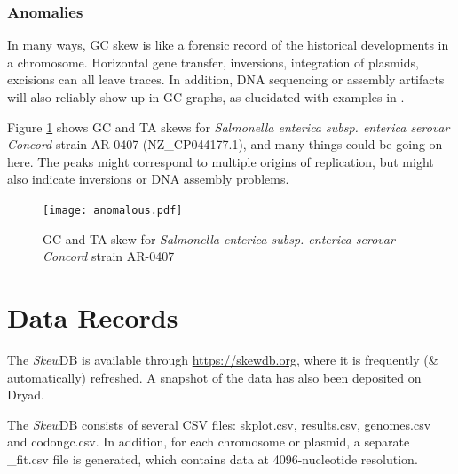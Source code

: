 \documentclass[fleqn,10pt]{wlscirep}
\begin{document}
\subsubsection*{Anomalies}
In many ways, GC skew is like a forensic record of the historical developments in a chromosome. Horizontal gene transfer, inversions, integration of plasmids, excisions can all leave traces. In addition, DNA sequencing or assembly artifacts will also reliably show up in GC graphs, as elucidated with examples in \cite{lu_skewit_2020}.

Figure \ref{fig:anomalous} shows GC and TA skews for \emph{Salmonella enterica subsp. enterica serovar Concord} strain AR-0407 (NZ\_CP044177.1), and many things could be going on here. The peaks might correspond to multiple origins of replication, but might also indicate inversions or DNA assembly problems.

\begin{figure}[ht]
\centering
\texttt{[image: anomalous.pdf]}
\caption{GC and TA skew for \emph{Salmonella enterica subsp. enterica serovar Concord} strain AR-0407}
\label{fig:anomalous}
\end{figure}

\section*{Data Records}
The \emph{Skew}DB is available through \url{https://skewdb.org}, where it is frequently (\& automatically) refreshed. A snapshot of the data has also been deposited on Dryad\cite{https://doi.org/10.5061/dryad.g4f4qrfr6}.

The \emph{Skew}DB consists of several CSV files: skplot.csv, results.csv, genomes.csv and codongc.csv.
In addition, for each chromosome or plasmid, a separate \_fit.csv file is generated, which contains data at 4096-nucleotide resolution.
\end{document}
